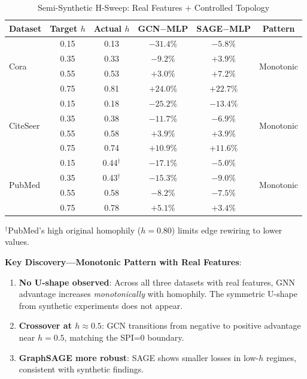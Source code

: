 \begin{table}[t]
\centering
\caption{Semi-Synthetic H-Sweep: Real Features + Controlled Topology}
\label{tab:semi_synthetic}
\begin{tabular}{@{}lccccc@{}}
\toprule
\textbf{Dataset} & \textbf{Target $h$} & \textbf{Actual $h$} & \textbf{GCN$-$MLP} & \textbf{SAGE$-$MLP} & \textbf{Pattern} \\
\midrule
\multirow{4}{*}{Cora} & 0.15 & 0.13 & $-31.4\%$ & $-5.8\%$ & \multirow{4}{*}{Monotonic} \\
 & 0.35 & 0.33 & $-9.2\%$ & $+3.9\%$ & \\
 & 0.55 & 0.53 & $+3.0\%$ & $+7.2\%$ & \\
 & 0.75 & 0.81 & $+24.0\%$ & $+22.7\%$ & \\
\midrule
\multirow{4}{*}{CiteSeer} & 0.15 & 0.18 & $-25.2\%$ & $-13.4\%$ & \multirow{4}{*}{Monotonic} \\
 & 0.35 & 0.38 & $-11.7\%$ & $-6.9\%$ & \\
 & 0.55 & 0.58 & $+3.9\%$ & $+3.9\%$ & \\
 & 0.75 & 0.74 & $+10.9\%$ & $+11.6\%$ & \\
\midrule
\multirow{4}{*}{PubMed} & 0.15 & 0.44$^\dag$ & $-17.1\%$ & $-5.0\%$ & \multirow{4}{*}{Monotonic} \\
 & 0.35 & 0.43$^\dag$ & $-15.3\%$ & $-9.0\%$ & \\
 & 0.55 & 0.58 & $-8.2\%$ & $-7.5\%$ & \\
 & 0.75 & 0.78 & $+5.1\%$ & $+3.4\%$ & \\
\bottomrule
\end{tabular}
\vspace{1mm}
\raggedright\small $^\dag$PubMed's high original homophily ($h=0.80$) limits edge rewiring to lower values.
\end{table}

\textbf{Key Discovery---Monotonic Pattern with Real Features}:
\begin{enumerate}
    \item \textbf{No U-shape observed}: Across all three datasets with real features, GNN advantage increases \textit{monotonically} with homophily. The symmetric U-shape from synthetic experiments does not appear.
    \item \textbf{Crossover at $h \approx 0.5$}: GCN transitions from negative to positive advantage near $h = 0.5$, matching the SPI=0 boundary.
    \item \textbf{GraphSAGE more robust}: SAGE shows smaller losses in low-$h$ regimes, consistent with synthetic findings.
\end{enumerate}

